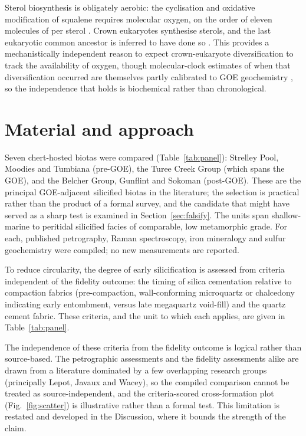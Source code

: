 \documentclass[11pt]{article}
\begin{document}
Sterol biosynthesis is obligately aerobic: the cyclisation and oxidative modification of squalene
requires molecular oxygen, on the order of eleven molecules of  per sterol
\citep{Gold2017,Desmond2009}. Crown eukaryotes synthesise sterols, and the last eukaryotic common
ancestor is inferred to have done so \citep{Desmond2009}. This provides a mechanistically independent
reason to expect crown-eukaryote diversification to track the availability of oxygen, though
molecular-clock estimates of when that diversification occurred are themselves partly calibrated to
GOE geochemistry \citep{Gold2017}, so the independence that holds is biochemical rather than
chronological.

\section{Material and approach}

Seven chert-hosted biotas were compared (Table~\ref{tab:panel}): Strelley Pool, Moodies and Tumbiana
(pre-GOE), the Turee Creek Group (which spans the GOE), and the Belcher Group, Gunflint and Sokoman
(post-GOE). These are the principal GOE-adjacent silicified biotas in the literature; the selection
is practical rather than the product of a formal survey, and the candidate that might have served as
a sharp test is examined in Section~\ref{sec:falsify}. The units span shallow-marine to peritidal
silicified facies of comparable, low metamorphic grade. For each, published petrography, Raman
spectroscopy, iron mineralogy and sulfur geochemistry were compiled; no new measurements are reported.

To reduce circularity, the degree of early silicification is assessed from criteria independent of
the fidelity outcome: the timing of silica cementation relative to compaction fabrics (pre-compaction,
wall-conforming microquartz or chalcedony indicating early entombment, versus late megaquartz
void-fill) and the quartz cement fabric. These criteria, and the unit to which each applies, are
given in Table~\ref{tab:panel}.

The independence of these criteria from the fidelity outcome is logical rather than source-based.
The petrographic assessments and the fidelity assessments alike are drawn from a literature dominated
by a few overlapping research groups (principally Lepot, Javaux and Wacey), so the compiled comparison
cannot be treated as source-independent, and the criteria-scored cross-formation plot
(Fig.~\ref{fig:scatter}) is illustrative rather than a formal test. This limitation is restated and
developed in the Discussion, where it bounds the strength of the claim.
\end{document}
